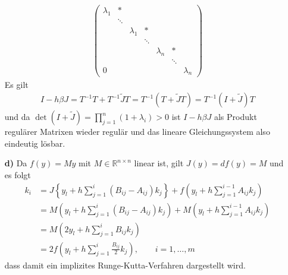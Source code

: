 \begin{solution}
\begin{itemize}
\begin{align*}
\begin{pmatrix}
      \lambda_1 & * & & & & &\\
       & \ddots &  & & & &\\
       & & \lambda_1 & * & & &\\
       & & & \ddots & & &\\
       & & & & \lambda_n & * &\\
       & & & & & \ddots & \\
      0 & & & & & & \lambda_n
    \end{pmatrix}
  \end{align*}
  Es gilt
  \begin{align*}
    I -h\beta J = T^{-1}T + T^{-1}\widetilde{J}T = T^{-1}\left(T + \widetilde{J}T\right)
    = T^{-1}\left(I + \widetilde{J}\right)T
  \end{align*}
  und da $\det(I + \widetilde{J}) = \prod_{j=1}^n(1 +\lambda_i) > 0$ ist
  $I - h\beta J$ als Produkt regulärer Matrixen wieder regulär und
  das lineare Gleichungssystem also eindeutig lösbar.
  \item [\textbf{d)}] Da $f(y) = My$ mit $M \in \mathbb{R}^{n \times n}$ linear ist,
  gilt $J(y) = df(y) = M$ und es folgt
  \begin{align*}
  k_i &= J\left\{y_l + h\sum_{j=1}^i(B_{ij} - A_{ij})k_j\right\} + f\left(y_l +
  h\sum_{j=1}^{i-1}A_{ij}k_j\right) \\
  &= M\left(y_l + h\sum_{j=1}^i(B_{ij} - A_{ij})k_j\right) + M\left(y_l +
  h\sum_{j=1}^{i-1}A_{ij}k_j\right) \\
  &= M\left(2y_l + h\sum_{j=1}^iB_{ij}k_j\right) \\
  &= 2f(y_l + h\sum_{j=1}^i\frac{B_{ij}}{2}k_j), \qquad i = 1,\dots,m
  \end{align*}
  dass damit ein implizites Runge-Kutta-Verfahren dargestellt wird.
\end{itemize}
\end{solution}
